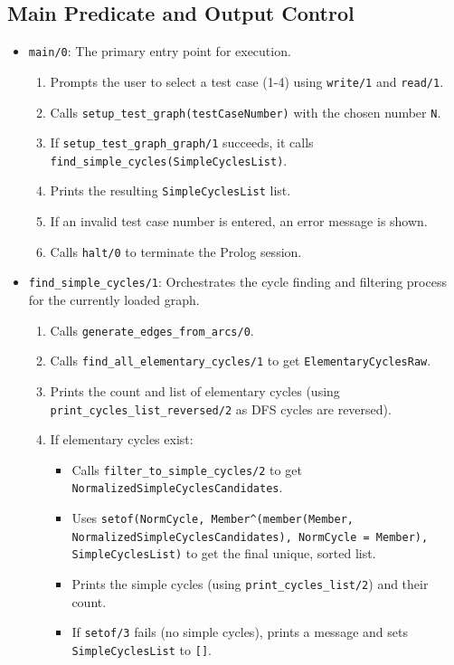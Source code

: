 \documentclass[12pt,a4paper]{article}
\begin{document}
\subsection{Main Predicate and Output Control}
\begin{itemize}
\item \texttt{main/0}: The primary entry point for execution.
\begin{enumerate}
\item Prompts the user to select a test case (1-4) using \texttt{write/1} and \texttt{read/1}.
\item Calls \texttt{setup\_test\_graph(testCaseNumber)} with the chosen number \texttt{N}.
\item If \texttt{setup\_test\_graph\_graph/1} succeeds, it calls \texttt{find\_simple\_cycles(SimpleCyclesList)}.
\item Prints the resulting \texttt{SimpleCyclesList} list.
\item If an invalid test case number is entered, an error message is shown.
\item Calls \texttt{halt/0} to terminate the Prolog session.
\end{enumerate}
\item \texttt{find\_simple\_cycles/1}: Orchestrates the cycle finding and filtering process for the currently loaded graph.
\begin{enumerate}
\item Calls \texttt{generate\_edges\_from\_arcs/0}.
\item Calls \texttt{find\_all\_elementary\_cycles/1} to get \texttt{ElementaryCyclesRaw}.
\item Prints the count and list of elementary cycles (using \texttt{print\_cycles\_list\_reversed/2} as DFS cycles are reversed).
\item If elementary cycles exist:
\begin{itemize}
\item Calls \texttt{filter\_to\_simple\_cycles/2} to get \texttt{NormalizedSimpleCyclesCandidates}.
\item Uses \texttt{setof(NormCycle, Member\textasciicircum{}(member(Member, NormalizedSimpleCyclesCandidates), NormCycle = Member), SimpleCyclesList)} to get the final unique, sorted list.
\item Prints the simple cycles (using \texttt{print\_cycles\_list/2}) and their count.
\item If \texttt{setof/3} fails (no simple cycles), prints a message and sets \texttt{SimpleCyclesList} to \texttt{[]}.

\end{itemize}
\end{enumerate}
\end{itemize}
\end{document}
